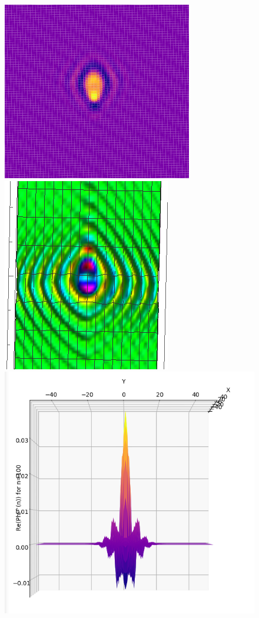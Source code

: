 \documentclass{article}
\theoremstyle{definition}
\begin{document}
\begin{figure}[!htb]
	\includegraphics[scale=0.55]{conv-2}
	\includegraphics[scale=0.5]{conv-3}\\
	\includegraphics[scale=0.3]{conv-4}

\end{figure}
\end{document}
